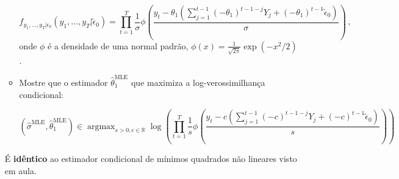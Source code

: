 \documentclass[10pt,a4paper]{article}
\begin{document}
\begin{enumerate}
\begin{itemize}
		$$f_{y_1,\ldots, y_T|\epsilon_0}(y_1,\ldots,y_T|\tilde{\epsilon}_0)=\prod_{t=1}^T \frac{1}{\sigma}\phi\left(\frac{y_t - \theta_1\left(\sum_{j=1}^{t-1}(-\theta_1)^{t-1 - j}Y_{j}  +  (-\theta_1)^{t-1}\tilde{\epsilon}_0\right)}{\sigma}\right)\, ,$$
	onde $\phi$ é a densidade de uma normal padrão, $\phi(x) = \frac{1}{\sqrt{2\pi}}\exp(-x^2/2)$.
	
	\item Mostre que o estimador $\hat{\theta}^{\text{MLE}}_1$ que maximiza a log-verossimilhança condicional:
	
	$$(\hat\sigma^{\text{MLE}}, \hat\theta_1^{\text{MLE}}) \in \operatorname{argmax}_{s> 0, c \in \mathbb{R}} \log\left(\prod_{t=1}^T\frac{1}{s}\phi\left(\frac{y_t - c\left(\sum_{j=1}^{t-1}(-c)^{t-1 - j}Y_{j}  +  (-c)^{t-1}\tilde{\epsilon}_0\right)}{s}\right)\right)$$
	\end{itemize}
	
	É \textbf{idêntico} ao estimador condicional de mínimos quadrados não lineares visto em aula.
\end{enumerate}
	
\end{document}
